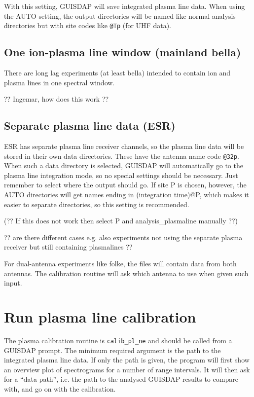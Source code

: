 \documentclass[a4]{article}
\begin{document}
With this setting, GUISDAP will save integrated plasma line data.
When using the AUTO setting, the output directories will be named like
normal analysis directories but with site codes like \texttt{@Tp} (for UHF data).


\subsection{One ion-plasma line window (mainland bella)}

There are long lag experiments (at least bella) intended to contain ion and plasma lines in one spectral window. 

?? Ingemar, how does this work ??


\subsection{Separate plasma line data (ESR)}
\label{sec:separate-plasma-line}

ESR has separate plasma line receiver channels, so the plasma line
data will be stored in their own data directories. These have the
antenna name code \texttt{@32p}. When such a data directory is selected, GUISDAP will automatically go to the plasma line integration mode, so no special settings should be necessary. Just remember to select where the output should go.
If site P is chosen, however, the AUTO directories will get names ending in (integration time)@P, which makes it easier to separate directories, so this setting is recommended.

(?? If this does not work then select P and analysis\_plasmaline manually ??)

?? are there different cases e.g. also experiments not using the
separate plasma receiver but still containing plasmalines ??

For dual-antenna experiments like folke, the files will contain data from both antennas. The calibration routine will ask which antenna to use when given such input.


\clearpage{}

\section{Run plasma line calibration}
\label{sec:run-plasma-line}

The plasma calibration routine is \texttt{calib\_pl\_ne} and should be
called from a GUISDAP prompt.  The minimum required argument is the
path to the integrated plasma line data. If only the path is given,
the program will first show an overview plot of spectrograms for a
number of range intervals. It will then ask for a ``data path'',
i.e. the path to the analysed GUISDAP results to compare with, and go
on with the calibration.
\end{document}
